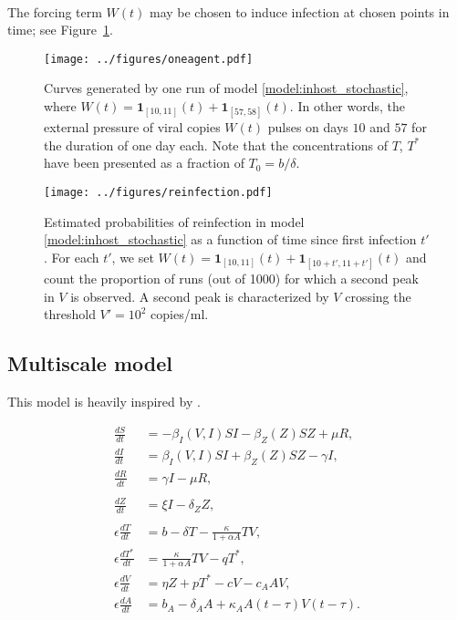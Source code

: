 \documentclass[11pt]{article}
\numberwithin{equation}{subsection}
\begin{document}
    ~

    The forcing term $W(t)$ may be chosen to induce infection at chosen points
    in time; see Figure~\ref{fig:oneagent}.

    \begin{figure}[h!]
    \begin{center}
        \texttt{[image: ../figures/oneagent.pdf]}
    \end{center}
    \caption{
        Curves generated by one run of model \ref{model:inhost_stochastic},
        where $W(t) = \mathbf{1}_{[10, 11]}(t) + \mathbf{1}_{[57, 58]}(t)$. In
        other words, the external pressure of viral copies $W(t)$ pulses on
        days $10$ and $57$ for the duration of one day each. Note that the
        concentrations of $T$, $T^*$ have been presented as a fraction of $T_0
        = b / \delta$.
    }
    \label{fig:oneagent}
    \end{figure}

    \begin{figure}[h!]
    \begin{center}
        \texttt{[image: ../figures/reinfection.pdf]}
    \end{center}
    \caption{
        Estimated probabilities of reinfection in model
        \ref{model:inhost_stochastic} as a function of time since first
        infection $t'$.  For each $t'$, we set $W(t) = \mathbf{1}_{[10,
        11]}(t) + \mathbf{1}_{[10 + t', 11 + t']}(t)$ and count the proportion
        of runs (out of 1000) for which a second peak in $V$ is observed. A
        second peak is characterized by $V$ crossing the threshold $V' = 10^2$
        copies/ml.
    }
    \label{fig:reinfection}
    \end{figure}


    \subsection{Multiscale model} \label{model:multiscale}

    This model is heavily inspired by \cite{wang2022}.

    \begin{align}
        \frac{dS}{dt} &= -\beta_I(V, I) SI - \beta_Z(Z) SZ + \mu R, \\
        \frac{dI}{dt} &= \beta_I(V, I) SI + \beta_Z(Z) SZ - \gamma I, \\
        \frac{dR}{dt} &= \gamma I - \mu R, \\\\
        \frac{dZ}{dt} &= \xi I - \delta_Z Z, \\\\
        \epsilon \frac{dT}{dt} &= b -  \delta T - \frac{\kappa}{1 + \alpha A} TV, \\
        \epsilon \frac{dT^*}{dt} &= \frac{\kappa}{1 + \alpha A} TV - qT^*, \\
        \epsilon \frac{dV}{dt} &= \eta Z + pT^* - cV - c_A AV, \\
        \epsilon \frac{dA}{dt} &= b_A -  \delta_A A + \kappa_A A(t - \tau)V(t - \tau).
    \end{align}
\end{document}
